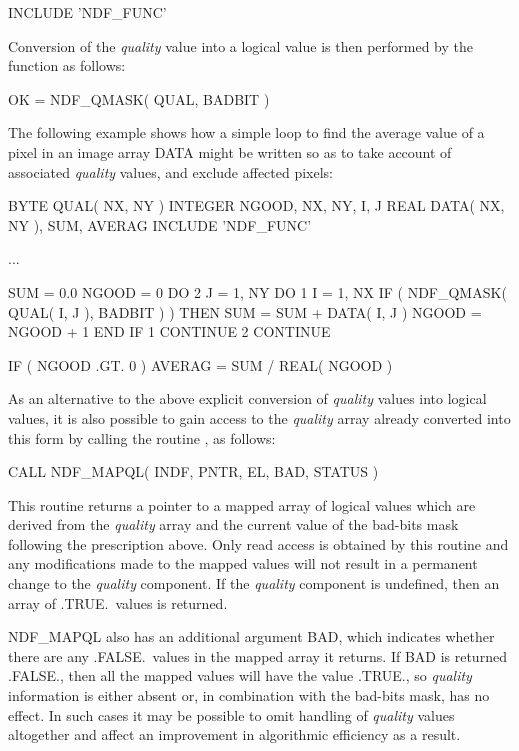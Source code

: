 \documentclass[twoside,11pt,nolof]{starlink}
\providecommand{\st}[1]{{\emph{#1}}}
\begin{document}
\small
\begin{terminalv}
      INCLUDE 'NDF_FUNC'
\end{terminalv}
\normalsize

Conversion of the \st{quality\/} value into a logical value is then performed by
the function as follows:

\small
\begin{terminalv}
      OK = NDF_QMASK( QUAL, BADBIT )
\end{terminalv}
\normalsize

The following example shows how a simple loop to find the average value of
a pixel in an image array DATA might be written so as to take account of
associated \st{quality\/} values, and exclude affected pixels:

\small
\begin{terminalv}
      BYTE QUAL( NX, NY )
      INTEGER NGOOD, NX, NY, I, J
      REAL DATA( NX, NY ), SUM, AVERAG
      INCLUDE 'NDF_FUNC'

      ...

      SUM = 0.0
      NGOOD = 0
      DO 2 J = 1, NY
         DO 1 I = 1, NX
            IF ( NDF_QMASK( QUAL( I, J ), BADBIT ) ) THEN
               SUM = SUM + DATA( I, J )
               NGOOD = NGOOD + 1
            END IF
 1       CONTINUE
 2    CONTINUE

      IF ( NGOOD .GT. 0 ) AVERAG = SUM / REAL( NGOOD )
\end{terminalv}
\normalsize

As an alternative to the above explicit conversion of \st{quality\/} values into
logical values, it is also possible to gain access to the \st{quality\/} array
already converted into this form by calling the routine , as
follows:

\small
\begin{terminalv}
      CALL NDF_MAPQL( INDF, PNTR, EL, BAD, STATUS )
\end{terminalv}
\normalsize

This routine returns a pointer to a mapped array of logical values which are
derived from the \st{quality\/} array and the current value of the bad-bits mask
following the prescription above.
Only read access is obtained by this routine and any modifications made to
the mapped values will not result in a permanent change to the \st{quality\/}
component.
If the \st{quality\/} component is undefined, then an array of .TRUE.\ values is
returned.

NDF\_MAPQL also has an additional argument BAD, which indicates whether
there are any .FALSE.\ values in the mapped array it returns.
If BAD is returned .FALSE., then all the mapped values will have the value
.TRUE., so \st{quality\/} information is either absent or, in combination with
the bad-bits mask, has no effect.
In such cases it may be possible to omit handling of \st{quality\/} values
altogether and affect an improvement in algorithmic efficiency as a result.
\end{document}
